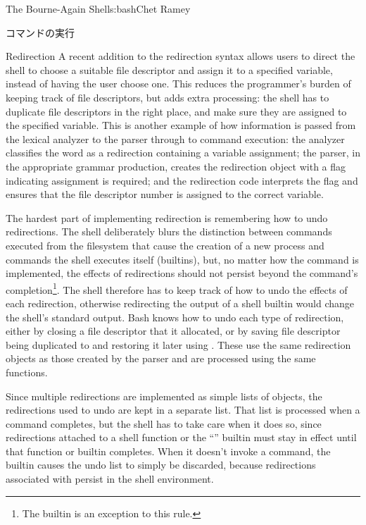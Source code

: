 \begin{aosachapter}{The Bourne-Again Shell}{s:bash}{Chet Ramey}
\begin{aosasect1}{コマンドの実行}
\begin{aosasect2}{Redirection}
A recent addition to the redirection syntax allows users to direct the
shell to choose a suitable file descriptor and assign it to a
specified variable, instead of having the user choose one.  This
reduces the programmer's burden of keeping track of file descriptors,
but adds extra processing: the shell has to duplicate file descriptors
in the right place, and make sure they are assigned to the specified
variable.  This is another example of how information is passed from
the lexical analyzer to the parser through to command execution: the
analyzer classifies the word as a redirection containing a variable
assignment; the parser, in the appropriate grammar production, creates
the redirection object with a flag indicating assignment is required;
and the redirection code interprets the flag and ensures that the file
descriptor number is assigned to the correct variable.

The hardest part of implementing redirection is remembering how to
undo redirections.  The shell deliberately blurs the distinction
between commands executed from the filesystem that cause the creation
of a new process and commands the shell executes itself (builtins),
but, no matter how the command is implemented, the effects of
redirections should not persist beyond the command's completion\footnote{The
 builtin is an exception to this rule.}. The shell therefore has
to keep track of how to undo the effects of each redirection,
otherwise redirecting the output of a shell builtin would change the
shell's standard output.  Bash knows how to undo each type of
redirection, either by closing a file descriptor that it allocated, or
by saving file descriptor being duplicated to and restoring it later
using .  These use the same redirection objects as those
created by the parser and are processed using the same functions.

Since multiple redirections are implemented as simple lists of
objects, the redirections used to undo are kept in a separate list.
That list is processed when a command completes, but the shell has to
take care when it does so, since redirections attached to a shell
function or the ``'' builtin must stay in effect until that
function or builtin completes.  When it doesn't invoke a command, the
 builtin causes the undo list to simply be discarded,
because redirections associated with  persist in the shell
environment.


\end{aosasect2}
\end{aosasect1}
\end{aosachapter}
